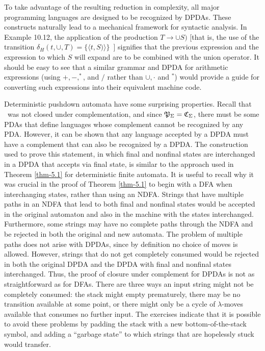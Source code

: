 To take advantage of the resulting reduction in complexity, all major
programming languages are designed to be recognized by DPDAs. These constructs
naturally lead to a mechanical framework for syntactic analysis. In Example
10.12, the application of the production $T\rightarrow\pmb{\cup} S\pmb{)}$ [that is,
the use of the transition $\delta_H(t,\pmb{\cup},T)=\{\langle t,S\pmb{)}\rangle\}$\ ]
signifies that the previous expression and the expression to which $S$ will
expand are to be combined with the union operator. It should be easy to see that
a similar grammar and DPDA for arithmetic expressions (using $+,-,^*$, and $/$
rather than $\cup,\cdot$ and $^*$) would provide a guide for converting such
expressions into their equivalent machine code.

Deterministic pushdown automata have some surprising properties. Recall that
\CSIG\ was not closed under complementation, and since $\mathfrak{P}_\Sigma=\mathfrak{C}_\Sigma$, there
must be some PDAs that define languages whose complement cannot be recognized by
any PDA. However, it can be shown that any language accepted by a DPDA must have
a complement that can also be recognized by a DPDA. The construction used to
prove this statement, in which final and nonfinal states are interchanged in a
DPDA that accepts via final state, is similar to the approach used in Theorem
\ref{thm-5.1} for deterministic finite automata. It is useful to recall why it was crucial
in the proof of Theorem \ref{thm-5.1} to begin with a DFA when interchanging states,
rather than using an NDFA. Strings that have multiple paths in an NDFA that lead
to both final and nonfinal states would be accepted in the original automaton
and also in the machine with the states interchanged. Furthermore, some strings
may have no complete paths through the NDFA and be rejected in both the original
and new automata. The problem of multiple paths does not arise with DPDAs, since
by definition no choice of moves is allowed. However, strings that do not get
completely consumed would be rejected in both the original DPDA and the DPDA
with final and nonfinal states interchanged. Thus, the proof of closure under
complement for DPDAs is not as straightforward as for DFAs. There are three ways
an input string might not be completely consumed: the stack might empty
prematurely, there may be no transition available at some point, or there might
only be a cycle of $\lambda$-moves available that consumes no further input. The
exercises indicate that it is possible to avoid these problems by padding the
stack with a new bottom-of-the-stack symbol, and adding a ``garbage state'' to
which strings that are hopelessly stuck would transfer.

